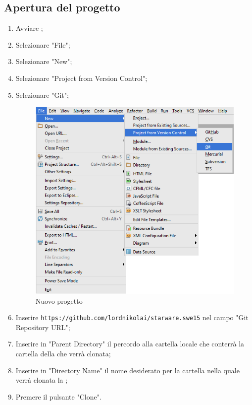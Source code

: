 \documentclass[12pt,a4paper]{article}
\begin{document}
	\subsection{Apertura del progetto}\label{nuovoProgetto}
	\begin{enumerate}
		\item Avviare  ;
		\item Selezionare "File";
		\item Selezionare "New";
		\item Selezionare "Project from Version Control";
		\item Selezionare "Git";

		\begin{center}
			\begin{figure}[H]
				\centering \includegraphics[max width=\textwidth]{../img/manualeSviluppatore/newProject.png}
				\caption{Nuovo progetto}
			\end{figure}
		\end{center}

		\item Inserire \texttt{https://github.com/lordnikolai/starware.swe15} nel campo "Git Repository URL"; 
		\item Inserire in "Parent Directory" il percordo alla cartella locale che conterrà la cartella della  che verrà clonata; 
		\item Inserire in "Directory Name" il nome desiderato per la cartella nella quale verrà clonata la ;
		\item Premere il pulsante "Clone".
	\end{enumerate}
\end{document}
